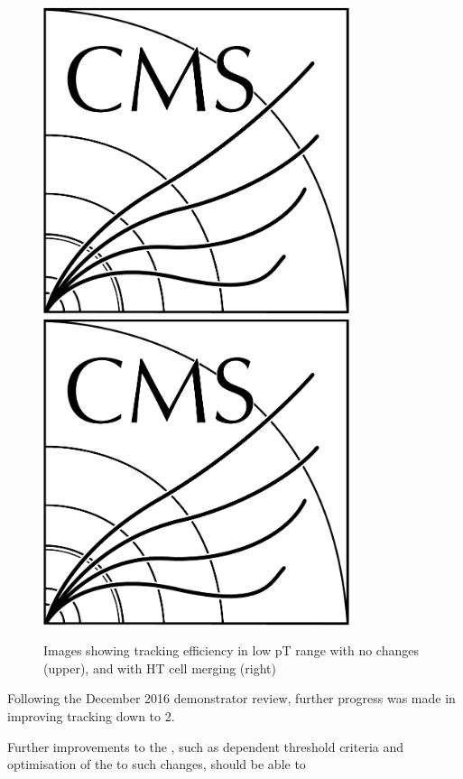 \begin{figure}[tbp]
\centering
\includegraphics[width=0.8\textwidth,trim={1.1truecm 0truecm 1truecm 12truecm},clip]{CMS-bw-logo.pdf}
\includegraphics[width=0.8\textwidth,trim={0.7truecm 0truecm 1truecm 0truecm},clip]{CMS-bw-logo.pdf}
\caption{Images showing tracking efficiency in low pT range with no changes (upper), and with HT cell merging (right)}
\label{fig:2GeVFlat}
\end{figure}


Following the December 2016 demonstrator review, further progress was made in improving tracking down to 2\GeV.


Further improvements to the \HT, such as \pt dependent threshold criteria and optimisation of the \KF to such changes, should be able to 